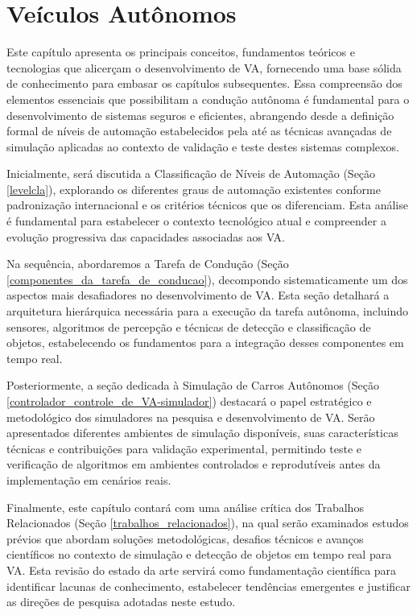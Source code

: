 \chapter{Veículos Autônomos} \label{direcao_autonoma}

Este capítulo apresenta os principais conceitos, fundamentos teóricos e tecnologias que alicerçam o desenvolvimento de VA, fornecendo uma base sólida de conhecimento para embasar os capítulos subsequentes. Essa compreensão dos elementos essenciais que possibilitam a condução autônoma é fundamental para o desenvolvimento de sistemas seguros e eficientes, abrangendo desde a definição formal de níveis de automação estabelecidos pela  até as técnicas avançadas de simulação aplicadas ao contexto de validação e teste destes sistemas complexos.

Inicialmente, será discutida a Classificação de Níveis de Automação (Seção \ref{levelcla}), explorando os diferentes graus de automação existentes conforme padronização internacional e os critérios técnicos que os diferenciam. Esta análise é fundamental para estabelecer o contexto tecnológico atual e compreender a evolução progressiva das capacidades associadas aos VA.

Na sequência, abordaremos a Tarefa de Condução (Seção \ref{componentes_da_tarefa_de_conducao}), decompondo sistematicamente um dos aspectos mais desafiadores no desenvolvimento de VA. Esta seção detalhará a arquitetura hierárquica necessária para a execução da tarefa autônoma, incluindo sensores, algoritmos de percepção e técnicas de detecção e classificação de objetos, estabelecendo os fundamentos para a integração desses componentes em tempo real.

Posteriormente, a seção dedicada à Simulação de Carros Autônomos (Seção \ref{controlador_controle_de_VA-simulador}) destacará o papel estratégico e metodológico dos simuladores na pesquisa e desenvolvimento de VA. Serão apresentados diferentes ambientes de simulação disponíveis, suas características técnicas e contribuições para validação experimental, permitindo teste e verificação de algoritmos em ambientes controlados e reprodutíveis antes da implementação em cenários reais.

Finalmente, este capítulo contará com uma análise crítica dos Trabalhos Relacionados (Seção \ref{trabalhos_relacionados}), na qual serão examinados estudos prévios que abordam soluções metodológicas, desafios técnicos e avanços científicos no contexto de simulação e detecção de objetos em tempo real para VA. Esta revisão do estado da arte servirá como fundamentação científica para identificar lacunas de conhecimento, estabelecer tendências emergentes e justificar as direções de pesquisa adotadas neste estudo.

